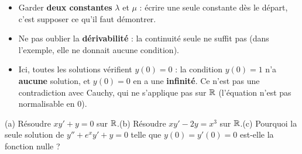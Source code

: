 \documentclass[a4paper,10pt]{article}
\begin{document}
\begin{PIEGE}
\begin{itemize}
\item Garder \textbf{deux constantes} $\lambda$ et $\mu$ : écrire une seule constante dès le départ, c'est supposer ce qu'il faut démontrer.
\item Ne pas oublier la \textbf{dérivabilité} : la continuité seule ne suffit pas (dans l'exemple, elle ne donnait aucune condition).
\item Ici, toutes les solutions vérifient $y(0)=0$ : la condition $y(0)=1$ n'a \textbf{aucune} solution, et $y(0)=0$ en a une
\textbf{infinité}. Ce n'est pas une contradiction avec Cauchy, qui ne s'applique pas sur $\mathbb{R}$ (l'équation n'est pas normalisable en $0$).
\end{itemize}
\end{PIEGE}

\begin{EXO}
(a) Résoudre $xy'+y=0$ sur $\mathbb{R}$.\quad (b) Résoudre $xy'-2y=x^3$ sur $\mathbb{R}$.\quad (c) Pourquoi la seule solution de $y''+e^xy'+y=0$ telle que
$y(0)=y'(0)=0$ est-elle la fonction nulle ?
\end{EXO}
\end{document}
